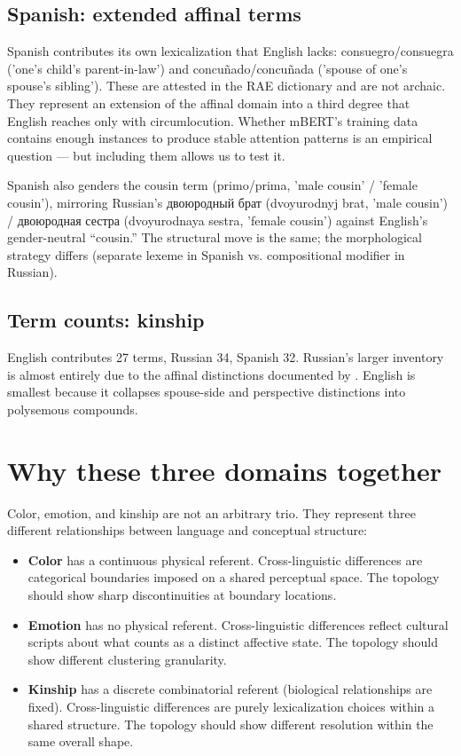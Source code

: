 \subsection{Spanish: extended affinal terms}
\label{sec:spanish-kinship}

Spanish contributes its own lexicalization that English lacks: consuegro/consuegra ('one's child's parent-in-law') and concuñado/concuñada ('spouse of one's spouse's sibling'). These are attested in the RAE dictionary and are not archaic. They represent an extension of the affinal domain into a third degree that English reaches only with circumlocution. Whether mBERT's training data contains enough instances to produce stable attention patterns is an empirical question --- but including them allows us to test it.

Spanish also genders the cousin term (primo/prima, 'male cousin' / 'female cousin'), mirroring Russian's двоюродный брат (dvoyurodnyj brat, 'male cousin') / двоюродная сестра (dvoyurodnaya sestra, 'female cousin') against English's gender-neutral ``cousin.'' The structural move is the same; the morphological strategy differs (separate lexeme in Spanish vs. compositional modifier in Russian).

\subsection{Term counts: kinship}

English contributes 27 terms, Russian 34, Spanish 32. Russian's larger inventory is almost entirely due to the affinal distinctions documented by \textcite{friedrich1964}. English is smallest because it collapses spouse-side and perspective distinctions into polysemous compounds.

\section{Why these three domains together}
\label{sec:domains-together}

Color, emotion, and kinship are not an arbitrary trio. They represent three different relationships between language and conceptual structure:

\begin{itemize}
\item \textbf{Color} has a continuous physical referent. Cross-linguistic differences are categorical boundaries imposed on a shared perceptual space. The topology should show sharp discontinuities at boundary locations.
\item \textbf{Emotion} has no physical referent. Cross-linguistic differences reflect cultural scripts about what counts as a distinct affective state. The topology should show different clustering granularity.
\item \textbf{Kinship} has a discrete combinatorial referent (biological relationships are fixed). Cross-linguistic differences are purely lexicalization choices within a shared structure. The topology should show different resolution within the same overall shape.
\end{itemize}

